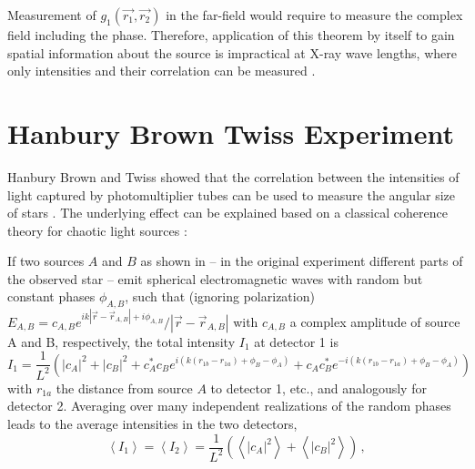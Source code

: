 Measurement of $g_1(\vec{r_1},\vec{r_2})$ in the far-field would require to measure the complex field including the phase. Therefore, application of this theorem by itself to gain spatial information about the source is impractical at X-ray wave lengths, where only intensities and their correlation can be measured \cite{classen2017}. 

\section{Hanbury Brown Twiss Experiment}
Hanbury Brown and Twiss showed that the correlation between the intensities of light captured by photomultiplier tubes can be used to measure the angular size of stars  \cite{hanbury1956inter}. The underlying effect can be explained based on a classical coherence theory for chaotic light sources \cite{baym1997,goodman2000}:

If two sources $A$ and $B$ as shown in   -- in the original experiment different parts of the observed star -- emit spherical electromagnetic waves with random but constant phases $\phi_{A,B}$, such that (ignoring polarization) $E_{A,B}=c_{A,B} e^{i k\left|\vec{r}-\vec{r}_{A,B}\right|+i \phi_{A,B}} /\left|\vec{r}-\vec{r}_{A,B}\right|$ with $c_{A,B}$ a complex amplitude of source A and B, respectively, the total intensity $I_{1}$ at detector 1 is
\begin{equation}
	I_{1} =
	\frac{1}{L^{2}}\left(
	|c_A|^{2}
	+|c_B|^{2}
	+c_A^{*} c_B     e^{ i\left(k\left(r_{1 b}-r_{1 a}\right)+\phi_{B}-\phi_{A}\right)}
	+c_A     c_B^{*} e^{-i\left(k\left(r_{1 b}-r_{1 a}\right)+\phi_{B}-\phi_{A}\right)}
	\right)
\end{equation}
with $r_{1 a}$ the distance from source $A$ to detector 1, etc., and analogously for detector 2.
Averaging over many independent realizations of the random phases leads to the average intensities in the two detectors,
\begin{equation}
	\left\langle I_{1}\right\rangle=\left\langle I_{2}\right\rangle=\frac{1}{L^{2}}\left(\left\langle|c_A|^{2}\right\rangle+\left\langle|c_B|^{2}\right\rangle\right) \,,
	\label{eq:intensity}
\end{equation}

